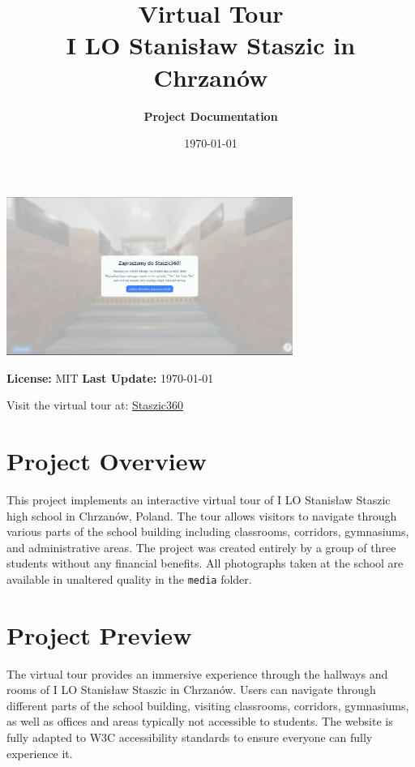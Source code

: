 \documentclass[11pt,a4paper]{article}
\title{\textbf{\Huge{\textcolor{staszicblue}{Virtual Tour}}}\\\Large{I LO Stanisław Staszic in Chrzanów}}
\author{\textbf{Project Documentation}}
\date{\today}
\begin{document}
\begin{titlepage}
\maketitle
\begin{center}
\includegraphics[width=0.7\textwidth]{./additional-media/preview-gif2.gif}

\vspace{1cm}
\begin{tcolorbox}[colback=staszicblue!5,colframe=staszicblue,title=Project Status]
\begin{center}
\textbf{License:} MIT \hspace{1cm} \textbf{Last Update:} \today
\end{center}
\end{tcolorbox}

\vspace{0.5cm}
\begin{tcolorbox}[colback=staszicgold!5,colframe=staszicgold,title=Live Demo]
Visit the virtual tour at: \href{https://staszic-virtual-walk.pages.dev}{Staszic360}
\end{tcolorbox}
\end{center}
\end{titlepage}

\section{Project Overview}
This project implements an interactive virtual tour of I LO Stanisław Staszic high school in Chrzanów, Poland. The tour allows visitors to navigate through various parts of the school building including classrooms, corridors, gymnasiums, and administrative areas. The project was created entirely by a group of three students without any financial benefits. All photographs taken at the school are available in unaltered quality in the \texttt{media} folder.

\section{Project Preview}
The virtual tour provides an immersive experience through the hallways and rooms of I LO Stanisław Staszic in Chrzanów. Users can navigate through different parts of the school building, visiting classrooms, corridors, gymnasiums, as well as offices and areas typically not accessible to students. The website is fully adapted to W3C accessibility standards to ensure everyone can fully experience it.
\end{document}
